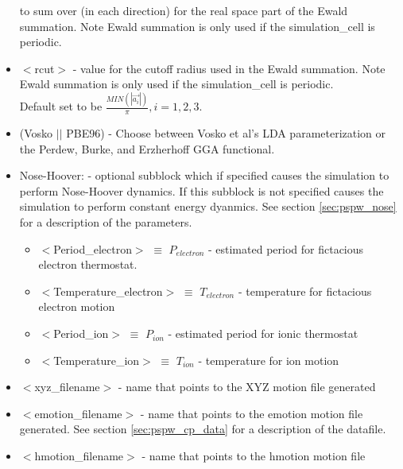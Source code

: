 \begin{itemize}
 			  to sum over (in each direction) for the real space
			  part of the Ewald summation. Note Ewald summation
                          is only used if the simulation\_cell is periodic.
	\item $<$rcut$>$ - value for the cutoff radius used
			  in the Ewald summation.  Note Ewald summation
                          is only used if the simulation\_cell is periodic. \\
                          Default set to be
		          $\frac{MIN(\left| \vec{a_i} \right|)}{\pi}, i=1,2,3$.
        \item (Vosko $||$ PBE96) - Choose between Vosko et al's LDA 
                               parameterization or the Perdew, Burke, 
                               and Erzherhoff GGA functional.
        \item Nose-Hoover: - optional subblock which if specified
                         causes the simulation to perform Nose-Hoover dynamics.
                         If this subblock is not specified causes the 
                         simulation to perform constant energy dyanmics.
                         See section \ref{sec:pspw_nose} for a description of the parameters.
                         \begin{itemize}
                             \item $<$Period\_electron$>$ $\equiv$ $P_{electron}$ 
                                    - estimated period for fictacious electron thermostat.
                             \item $<$Temperature\_electron$>$ $\equiv$ $T_{electron}$ 
                                    - temperature for fictacious electron motion
                             \item $<$Period\_ion$>$ $\equiv$ $P_{ion}$ 
                                    - estimated period for ionic thermostat
                             \item $<$Temperature\_ion$>$ $\equiv$ $T_{ion}$ 
                                    - temperature for ion motion
                         \end{itemize}
	\item $<$xyz\_filename$>$ - name that points to the XYZ motion file
				generated
        \item $<$emotion\_filename$>$ - name that points to the emotion motion file
				generated. See section \ref{sec:pspw_cp_data} for a 
                                description of the datafile.
        \item $<$hmotion\_filename$>$ - name that points to the hmotion motion file

\end{itemize}
